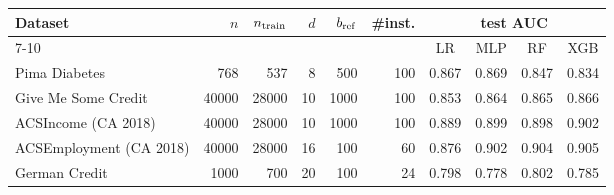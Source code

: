 \begin{tabular}{lrrrrrcccc}
\toprule
Dataset & $n$ & $n_{\rm train}$ & $d$ & $b_{\rm ref}$ & \#inst. & \multicolumn{4}{c}{test AUC}\\
\cmidrule(lr){7-10}
 & & & & & & LR & MLP & RF & XGB\\
\midrule
Pima Diabetes & 768 & 537 & 8 & 500 & 100 & 0.867 & 0.869 & 0.847 & 0.834\\
Give Me Some Credit & 40000 & 28000 & 10 & 1000 & 100 & 0.853 & 0.864 & 0.865 & 0.866\\
ACSIncome (CA 2018) & 40000 & 28000 & 10 & 1000 & 100 & 0.889 & 0.899 & 0.898 & 0.902\\
ACSEmployment (CA 2018) & 40000 & 28000 & 16 & 100 & 60 & 0.876 & 0.902 & 0.904 & 0.905\\
German Credit & 1000 & 700 & 20 & 100 & 24 & 0.798 & 0.778 & 0.802 & 0.785\\
\bottomrule
\end{tabular}